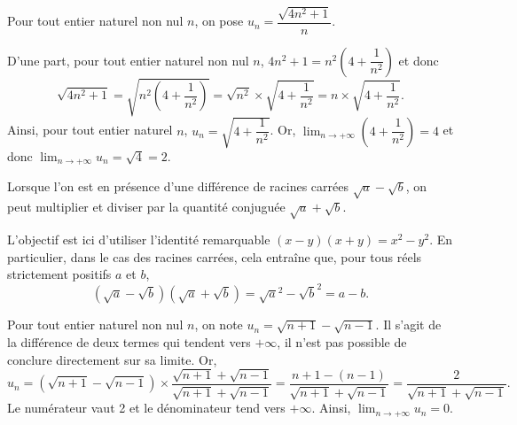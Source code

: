 \documentclass[11pt,fleqn]{book} %
\begin{document}
\begin{example}Pour tout entier naturel non nul $n$, on pose $u_n = \dfrac{\sqrt{4n^2+1}}{n}$.

D'une part, pour tout entier naturel non nul $n$, $4n^2+1=n^2\left(4+\dfrac{1}{n^2}\right)$ et donc 
\[\sqrt{4n^2+1}=\sqrt{n^2\left(4+\dfrac{1}{n^2}\right)}=\sqrt{n^2}\times \sqrt{4+\dfrac{1}{n^2}}=n \times  \sqrt{4+\dfrac{1}{n^2}}.\]
Ainsi, pour tout entier naturel $n$, $u_n=\sqrt{4+\dfrac{1}{n^2}}$. Or, $\displaystyle\lim_{n\to + \infty}\left(4+\dfrac{1}{n^2}\right)=4$ et donc $\displaystyle\lim_{n\to + \infty} u_n = \sqrt{4}=2$.\end{example}

Lorsque l'on est en présence d'une différence de racines carrées $\sqrt{a}-\sqrt{b}$, on peut multiplier et diviser par la quantité conjuguée $\sqrt{a}+\sqrt{b}$.

L'objectif est ici d'utiliser l'identité remarquable $(x-y)(x+y)=x^2-y^2$. En particulier, dans le cas des racines carrées, cela entraîne que, pour tous réels strictement positifs $a$ et $b$,\[(\sqrt{a}-\sqrt{b})(\sqrt{a}+\sqrt{b})=\sqrt{a}^2-\sqrt{b}^2=a-b.\]

\begin{example} Pour tout entier naturel non nul $n$, on note $u_n=\sqrt{n+1}-\sqrt{n-1}$. Il s'agit de la différence de deux termes qui tendent vers $+\infty$, il n'est pas possible de conclure directement sur sa limite. Or,
\[ u_n = (\sqrt{n+1}-\sqrt{n-1}) \times \dfrac{\sqrt{n+1}+\sqrt{n-1}}{\sqrt{n+1}+\sqrt{n-1}}=\dfrac{n+1-(n-1)}{\sqrt{n+1}+\sqrt{n-1}}=\dfrac{2}{\sqrt{n+1}+\sqrt{n-1}}.\]
Le numérateur vaut 2 et le dénominateur tend vers $+\infty$. Ainsi, $\displaystyle \lim_{n \to +\infty} u_n = 0$.
\end{example}

\newpage
\end{document}
